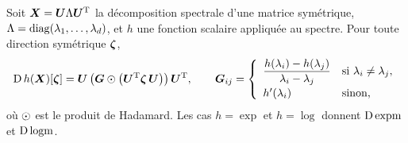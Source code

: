 \begin{proposition}
\label{prop:spdnet-diffm}
  Soit $\boldsymbol{X}=\boldsymbol{U}\Lambda\boldsymbol{U}^{\mathrm{T}}$ la décomposition spectrale d'une matrice
  symétrique, $\Lambda=\operatorname{\operatorname{diag}}(\lambda_1,\dots,\lambda_d)$, et $h$ une fonction
  scalaire appliquée au spectre. Pour toute direction symétrique $\boldsymbol{\zeta}$,
  \begin{equation}
    \operatorname{\mathrm{D}} h(\boldsymbol{X})[\boldsymbol{\zeta}]
    =
    \boldsymbol{U}\left(\boldsymbol{G}\odot\left(\boldsymbol{U}^{\mathrm{T}}\boldsymbol{\zeta}\,\boldsymbol{U}\right)\right)\boldsymbol{U}^{\mathrm{T}},
    \qquad
    \boldsymbol{G}_{ij}
    =
    \left\{
    \begin{array}{ll}
      \dfrac{h(\lambda_i)-h(\lambda_j)}{\lambda_i-\lambda_j}
        & \text{si } \lambda_i\neq\lambda_j,\\[8pt]
      h'(\lambda_i) & \text{sinon,}
    \end{array}
    \right.
    \label{eq:spdnet-daleckii}
  \end{equation}
  où $\odot$ est le produit de Hadamard. Les cas $h=\exp$ et $h=\log$ donnent
  $\operatorname{\mathrm{D}}\operatorname{\operatorname{expm}}$ et $\operatorname{\mathrm{D}}\operatorname{\operatorname{logm}}$.
\end{proposition}


